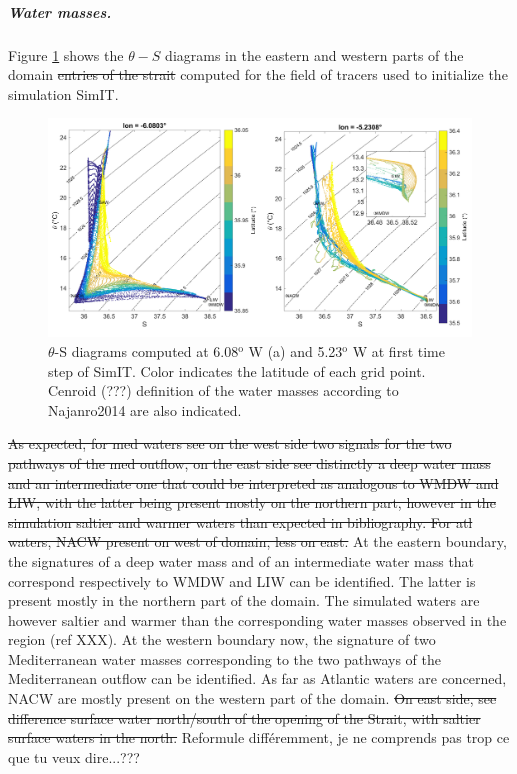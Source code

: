\subparagraph{Water masses.}
\label{sectionWaterMasses}
Figure \ref{Fig_Ini_WM3D} shows \color{blue} the $\theta-S$ diagrams in the eastern and western parts of the domain \color{black} \sout{entries of the strait} computed for \color{blue}the field of tracers used to initialize the \color{black} simulation SimIT. 
\begin{figure}[!h]
        \includegraphics[width=\textwidth]{./GBR3D/WM_ini_IES.png}
        \caption{$\theta$-S diagrams computed at 6.08$^\text{o}$ W (a) and 5.23$^\text{o}$ W at first time step of SimIT. Color indicates the latitude of each grid point. \color{green}Cenroid (???) \color{black}definition of the water masses according to Najanro2014 are also indicated.}
        \label{Fig_Ini_WM3D}
\end{figure}
\sout{As expected, for med waters see on the west side two signals for the two pathways of the med outflow, on the east side see distinctly a deep water mass and an intermediate one that could be interpreted as analogous to WMDW and LIW, with the latter being present mostly on the northern part, however in the simulation saltier and warmer waters than expected in bibliography. For atl waters, NACW present on west of domain, less on east.}
\color{blue}At the eastern boundary, the signatures of a deep water mass and of an intermediate water mass that correspond respectively to WMDW and LIW can be identified. The latter is present mostly in the northern part of the domain. The simulated waters are however saltier and warmer than the corresponding water masses observed in the region (ref XXX).
At the western boundary now, the signature of two Mediterranean water masses corresponding to the two pathways of the Mediterranean outflow can be identified.
As far as Atlantic waters are concerned, NACW are mostly present on the western part of the domain. 
\sout{On east side, see difference surface water north/south of the opening of the Strait, with saltier surface waters in the north. } \color{green} Reformule différemment, je ne comprends pas trop ce que tu veux dire...??? \color{black}

